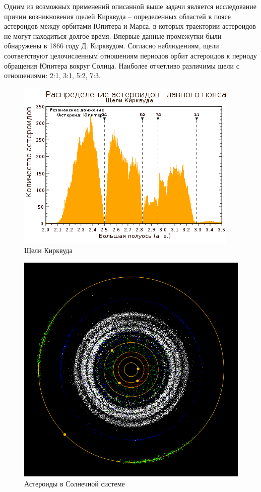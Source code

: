 Одним из возможных применений описанной выше задачи является исследование причин возникновения щелей Кирквуда -- определенных областей в поясе астероидов между орбитами Юпитера и Марса, в которых траектории астероидов не могут находиться долгое время. Впервые данные промежутки были обнаружены в 1866 году Д. Кирквудом. Согласно наблюдениям, щели соответствуют целочисленным отношениям периодов орбит астероидов к периоду обращения Юпитера вокруг Солнца. Наиболее отчетливо различимы щели с отношениями: 2:1, 3:1, 5:2, 7:3. 

\begin{figure}[H]
\centering
\includegraphics[scale=0.6]{../img/gaps.png}
\caption{Щели Кирквуда}

\end{figure}

\begin{figure}[H]
\centering
\includegraphics[scale=0.25]{../img/gaps2.png}
\caption{Астероиды в Солнечной системе} 

\end{figure}

